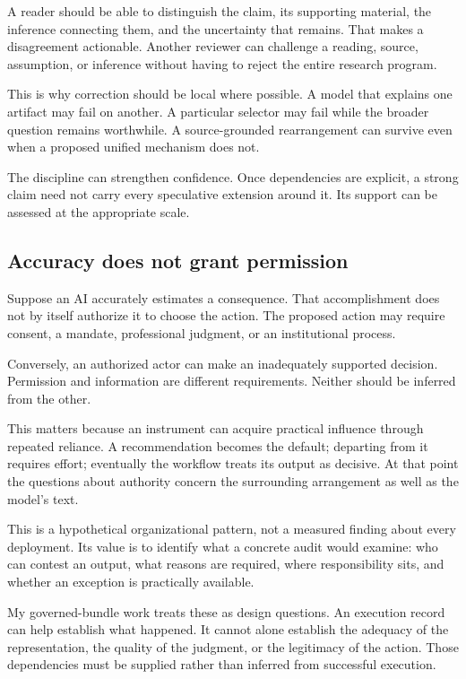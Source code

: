 \documentclass[11pt]{article}
\begin{document}
A reader should be able to distinguish the claim, its supporting material,
the inference connecting them, and the uncertainty that remains.
That makes a disagreement actionable. Another reviewer can challenge a
reading, source, assumption, or inference without having to reject the
entire research program.

This is why correction should be local where possible. A model that explains
one artifact may fail on another. A particular selector may fail while the
broader question remains worthwhile. A source-grounded rearrangement can
survive even when a proposed unified mechanism does not.

The discipline can strengthen confidence. Once dependencies are explicit,
a strong claim need not carry every speculative extension around it.
Its support can be assessed at the appropriate scale.

\subsection{Accuracy does not grant permission}

Suppose an AI accurately estimates a consequence. That accomplishment does
not by itself authorize it to choose the action. The proposed action may
require consent, a mandate, professional judgment, or an institutional process.

Conversely, an authorized actor can make an inadequately supported decision.
Permission and information are different requirements. Neither should
be inferred from the other.

This matters because an instrument can acquire practical influence through
repeated reliance. A recommendation becomes the default; departing from it
requires effort; eventually the workflow treats its output as decisive.
At that point the questions about authority concern the surrounding arrangement
as well as the model's text.

This is a hypothetical organizational pattern, not a measured finding about
every deployment. Its value is to identify what a concrete audit would examine:
who can contest an output, what reasons are required, where responsibility
sits, and whether an exception is practically available.

My governed-bundle work treats these as design questions.\cite{bundles}
An execution record can help establish what happened. It cannot alone
establish the adequacy of the representation, the quality of the judgment,
or the legitimacy of the action. Those dependencies must be supplied
rather than inferred from successful execution.
\end{document}
